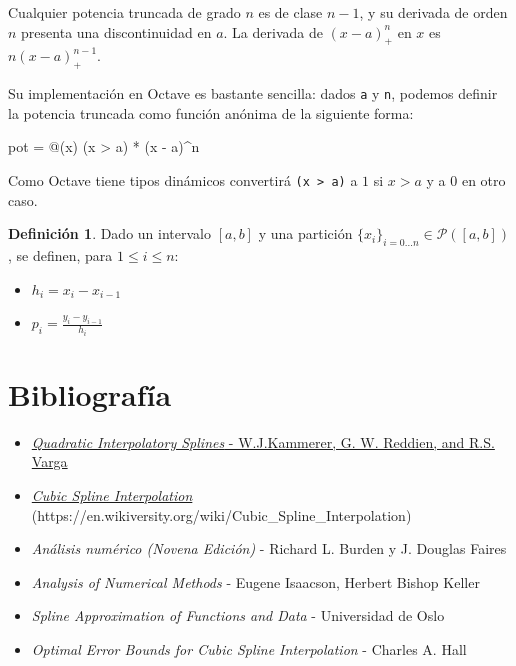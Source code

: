 \documentclass[11pt,spanish,]{article}
\newenvironment{Shaded}{}{}
\newcommand{\NormalTok}[1]{{#1}}
\theoremstyle{definition} \newtheorem*{definicion}{Definición}
\begin{document}
Cualquier potencia truncada de grado $n$ es de clase $n - 1$, y su
derivada de orden $n$ presenta una discontinuidad en $a$. La derivada de
$(x - a)_+^n$ en $x$ es $n(x - a)_+^{n-1}$.

Su implementación en Octave es bastante sencilla: dados \texttt{a} y
\texttt{n}, podemos definir la potencia truncada como función anónima de
la siguiente forma:

\begin{Shaded}
\begin{Highlighting}[]
\NormalTok{pot = @(x) (x > a) * (x - a)^n}
\end{Highlighting}
\end{Shaded}

Como Octave tiene tipos dinámicos convertirá
\texttt{(x \textgreater{} a)} a $1$ si $x > a$ y a $0$ en otro caso.

\begin{definicion}
Dado un intervalo $[a,b]$ y una partición $\{x_i\}_{i = 0...n} \in \mathscr{P}([a,b])$,
se definen, para $1 \leq i \leq n$:

\begin{itemize}
\item $\displaystyle h_i = x_i - x_{i-1}$
\item $\displaystyle p_i = \frac{y_i-y_{i-1}}{h_i}$
\end{itemize}
\end{definicion}

\section{Bibliografía}\label{bibliografuxeda}

\begin{itemize}
\itemsep1pt\parskip0pt
\item
  \href{http://www.math.kent.edu/~varga/pub/paper_85.pdf}{\emph{Quadratic
  Interpolatory Splines} - W.J.Kammerer, G. W. Reddien, and R.S. Varga}
\item
  \href{https://en.wikiversity.org/wiki/Cubic_Spline_Interpolation}{\emph{Cubic
  Spline Interpolation}}
  (https://en.wikiversity.org/wiki/Cubic\_Spline\_Interpolation)
\item
  \emph{Análisis numérico (Novena Edición)} - Richard L. Burden y J.
  Douglas Faires
\item
  \emph{Analysis of Numerical Methods} - Eugene Isaacson, Herbert Bishop
  Keller
\item
  \emph{Spline Approximation of Functions and Data} - Universidad de
  Oslo
\item
  \emph{Optimal Error Bounds for Cubic Spline Interpolation} - Charles
  A. Hall
\end{itemize}
\end{document}
